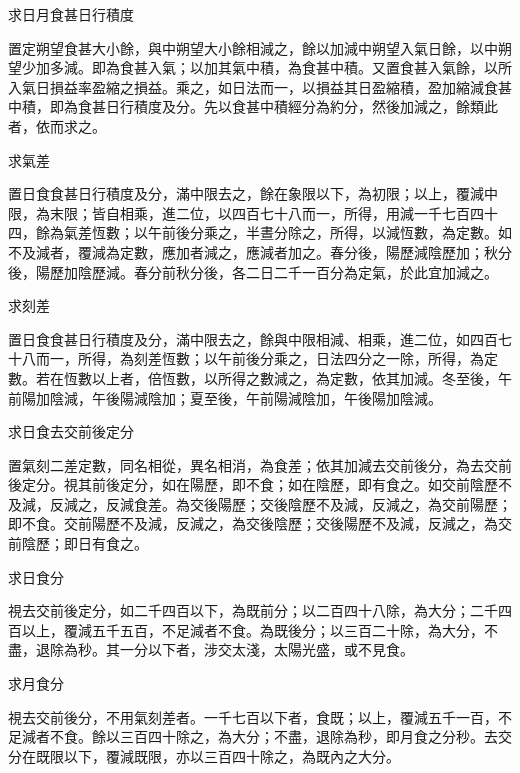 \begin{pinyinscope}
 求日月食甚日行積度



 置定朔望食甚大小餘，與中朔望大小餘相減之，餘以加減中朔望入氣日餘，以中朔望少加多減。即為食甚入氣；以加其氣中積，為食甚中積。又置食甚入氣餘，以所入氣日損益率盈縮之損益。乘之，如日法而一，以損益其日盈縮積，盈加縮減食甚中積，即為食甚日行積度及分。先以食甚中積經分為約分，然後加減之，餘類此者，依而求之。



 求氣差



 置日食食甚日行積度及分，滿中限去之，餘在象限以下，為初限；以上，覆減中限，為末限；皆自相乘，進二位，以四百七十八而一，所得，用減一千七百四十四，餘為氣差恆數；以午前後分乘之，半晝分除之，所得，以減恆數，為定數。如不及減者，覆減為定數，應加者減之，應減者加之。春分後，陽歷減陰歷加；秋分後，陽歷加陰歷減。春分前秋分後，各二日二千一百分為定氣，於此宜加減之。



 求刻差



 置日食食甚日行積度及分，滿中限去之，餘與中限相減、相乘，進二位，如四百七十八而一，所得，為刻差恆數；以午前後分乘之，日法四分之一除，所得，為定數。若在恆數以上者，倍恆數，以所得之數減之，為定數，依其加減。冬至後，午前陽加陰減，午後陽減陰加；夏至後，午前陽減陰加，午後陽加陰減。



 求日食去交前後定分



 置氣刻二差定數，同名相從，異名相消，為食差；依其加減去交前後分，為去交前後定分。視其前後定分，如在陽歷，即不食；如在陰歷，即有食之。如交前陰歷不及減，反減之，反減食差。為交後陽歷；交後陰歷不及減，反減之，為交前陽歷；即不食。交前陽歷不及減，反減之，為交後陰歷；交後陽歷不及減，反減之，為交前陰歷；即日有食之。



 求日食分



 視去交前後定分，如二千四百以下，為既前分；以二百四十八除，為大分；二千四百以上，覆減五千五百，不足減者不食。為既後分；以三百二十除，為大分，不盡，退除為秒。其一分以下者，涉交太淺，太陽光盛，或不見食。



 求月食分



 視去交前後分，不用氣刻差者。一千七百以下者，食既；以上，覆減五千一百，不足減者不食。餘以三百四十除之，為大分；不盡，退除為秒，即月食之分秒。去交分在既限以下，覆減既限，亦以三百四十除之，為既內之大分。




\end{pinyinscope}
